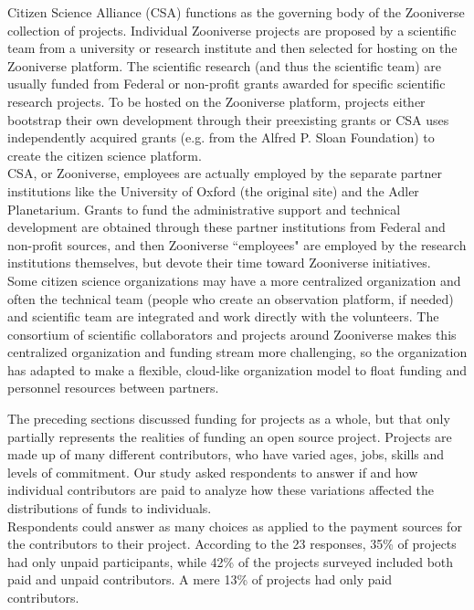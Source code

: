 \noindent Citizen Science Alliance (CSA) functions as the governing body of the Zooniverse collection of projects. Individual Zooniverse projects are proposed by a scientific team from a university or research institute and then selected for hosting on the Zooniverse platform. The scientific research (and thus the scientific team) are usually funded from Federal or non-profit grants awarded for specific scientific research projects. To be hosted on the Zooniverse platform, projects either bootstrap their own development through their preexisting grants or CSA uses independently acquired grants (e.g. from the Alfred P. Sloan Foundation) to create the citizen science platform.\\

\noindent CSA, or Zooniverse, employees are actually employed by the separate partner institutions like the University of Oxford (the original site) and the Adler Planetarium. Grants to fund the administrative support and technical development are obtained through these partner institutions from Federal and non-profit sources, and then Zooniverse ``employees" are employed by the research institutions themselves, but devote their time toward Zooniverse initiatives.\\

\noindent Some citizen science organizations may have a more centralized organization and often the technical team (people who create an observation platform, if needed) and scientific team are integrated and work directly with the volunteers. The consortium of scientific collaborators and projects around Zooniverse makes this centralized organization and funding stream more challenging, so the organization has adapted to make a flexible, cloud-like organization model to float funding and personnel resources between partners.


\noindent The preceding sections discussed funding for projects as a whole, but that only partially represents the realities of funding an open source project. Projects are made up of many different contributors, who have varied ages, jobs, skills and levels of commitment. Our study asked respondents to answer if and how individual contributors are paid to analyze how these variations affected the distributions of funds to individuals. \\

\noindent Respondents could answer as many choices as applied to the payment sources for the contributors to their project. According to the 23 responses, 35\% of projects had only unpaid participants, while 42\% of the projects surveyed included both paid and unpaid contributors. A mere 13\% of projects had only paid contributors.\\

